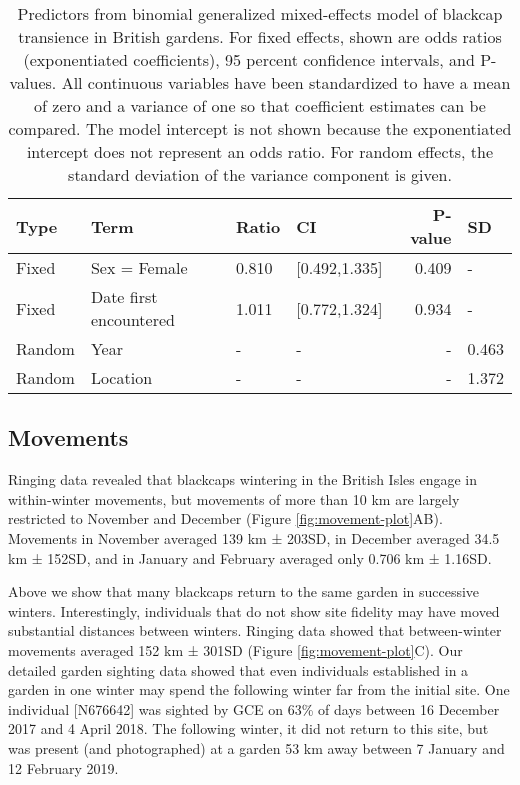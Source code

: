 \documentclass[a4paper, nobind]{templates/ociamthesis}
\begin{document}
\begin{table}[t]

\caption{\label{tab:transience-model-table}Predictors from binomial generalized mixed-effects model of blackcap transience in British gardens. For fixed effects, shown are odds ratios (exponentiated coefficients), 95 percent confidence intervals, and P-values. All continuous variables have been standardized to have a mean of zero and a variance of one so that coefficient estimates can be compared. The model intercept is not shown because the exponentiated intercept does not represent an odds ratio. For random effects, the standard deviation of the variance component is given.}
\centering
\fontsize{9.5}{11.5}\selectfont
\begin{tabular}{l|l|l|l|r|l}
\hline
Type & Term & Ratio & CI & P-value & SD\\
\hline
Fixed & Sex = Female & 0.810 & [0.492,1.335] & 0.409 & -\\
\hline
Fixed & Date first encountered & 1.011 & [0.772,1.324] & 0.934 & -\\
\hline
Random & Year & - & - & - & 0.463\\
\hline
Random & Location & - & - & - & 1.372\\
\hline
\end{tabular}
\end{table}

\hypertarget{movements-1}{%
\subsection{Movements}\label{movements-1}}

Ringing data revealed that blackcaps wintering in the British Isles engage in within-winter movements, but movements of more than 10 km are largely restricted to November and December (Figure \ref{fig:movement-plot}AB). Movements in November averaged 139 km ± 203SD, in December averaged 34.5 km ± 152SD, and in January and February averaged only 0.706 km ± 1.16SD.

Above we show that many blackcaps return to the same garden in successive winters. Interestingly, individuals that do not show site fidelity may have moved substantial distances between winters. Ringing data showed that between-winter movements averaged 152 km ± 301SD (Figure \ref{fig:movement-plot}C). Our detailed garden sighting data showed that even individuals established in a garden in one winter may spend the following winter far from the initial site. One individual {[}N676642{]} was sighted by GCE on 63\% of days between 16 December 2017 and 4 April 2018. The following winter, it did not return to this site, but was present (and photographed) at a garden 53 km away between 7 January and 12 February 2019.
\end{document}
